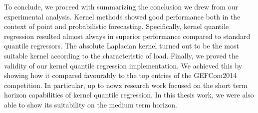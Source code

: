 To conclude, we proceed with summarizing the conclusion we drew from our experimental analysis.
Kernel methods showed good performance both in the context of point and probabilistic forecasting.
Specifically, kernel quantile regression resulted almost always in superior performance compared to standard quantile regressors. The absolute Laplacian kernel turned out to be the most suitable kernel according to the characteristic of load. Finally, we proved the validity of our kernel quantile regression implementation. We achieved this by showing how it compared favourably to the top entries of the GEFCom2014 competition. 
In particular, up to nowx research work focused on the short term horizon capabilities of kernel quantile regression. In this thesis work, we were also able to show its suitability on the medium term horizon. 